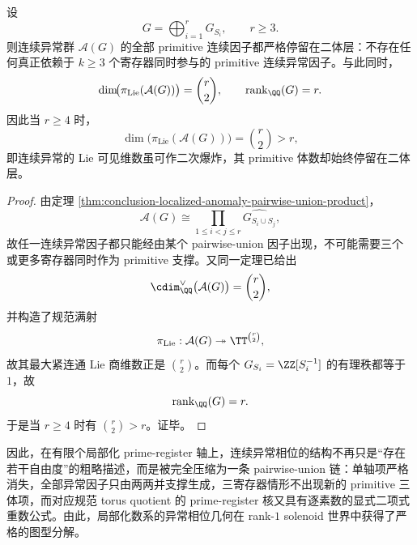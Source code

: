\begin{corollary}[连续异常函子的严格二体化与二次维数增长]\label{cor:conclusion-localized-anomaly-strictly-pairwise-quadratic-growth}
设
\[
G=\bigoplus_{i=1}^r G_{S_i},
\qquad r\ge 3.
\]
则连续异常群 \(\mathcal A(G)\) 的全部 primitive 连续因子都严格停留在二体层：不存在任何真正依赖于 \(k\ge 3\) 个寄存器同时参与的 primitive 连续异常因子。与此同时，
\[
\dim\!\bigl(\pi_{\mathrm{Lie}}(\mathcal A(G))\bigr)=\binom r2,
\qquad
\operatorname{rank}_{\QQ}(G)=r.
\]
因此当 \(r\ge 4\) 时，
\[
\dim\!\bigl(\pi_{\mathrm{Lie}}(\mathcal A(G))\bigr)=\binom r2>r,
\]
即连续异常的 Lie 可见维数虽可作二次爆炸，其 primitive 体数却始终停留在二体层。
\end{corollary}
\begin{proof}
由定理 \ref{thm:conclusion-localized-anomaly-pairwise-union-product}，
\[
\mathcal A(G)\cong \prod_{1\le i<j\le r}\widehat{G_{S_i\cup S_j}},
\]
故任一连续异常因子都只能经由某个 pairwise-union 因子出现，不可能需要三个或更多寄存器同时作为 primitive 支撑。又同一定理已给出
\[
\cdim_{\QQ}^{\vee}\bigl(\mathcal A(G)\bigr)=\binom r2,
\]
并构造了规范满射
\[
\pi_{\mathrm{Lie}}:\mathcal A(G)\twoheadrightarrow \TT^{\binom r2},
\]
故其最大紧连通 Lie 商维数正是 \(\binom r2\)。而每个 \(G_{S_i}=\ZZ[S_i^{-1}]\) 的有理秩都等于 \(1\)，故
\[
\operatorname{rank}_{\QQ}(G)=r.
\]
于是当 \(r\ge 4\) 时有 \(\binom r2>r\)。证毕。
\end{proof}

因此，在有限个局部化 prime-register 轴上，连续异常相位的结构不再只是“存在若干自由度”的粗略描述，而是被完全压缩为一条 pairwise-union 链：单轴项严格消失，全部异常因子只由两两并支撑生成，三寄存器情形不出现新的 primitive 三体项，而对应规范 torus quotient 的 prime-register 核又具有逐素数的显式二项式重数公式。由此，局部化数系的异常相位几何在 rank-\(1\) solenoid 世界中获得了严格的图型分解。

\endinput
